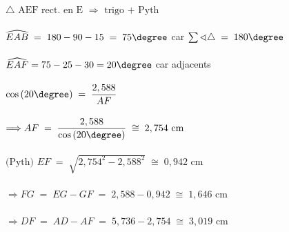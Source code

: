 \begin{itemize}
	$\triangle\mbox{ AEF rect. en E }\Rightarrow\mbox{ trigo + Pyth }$\\
	$ $\\
	$\widehat{EAB}\;=\;180-90-15\;=\;75\degree$ car $\sum \sphericalangle \triangle \;=\; 180\degree$\\
	$ $\\
	$\widehat{EAF}=75-25-30=20\degree$ car adjacents\\
	$ $\\
	$\cos{(20\degree)}\;=\;\dfrac{2,588}{AF}$\\
	$ $\\
	$\Longrightarrow AF\;=\;\dfrac{2,588}{\cos{(20\degree)}}\;\cong\;2,754\mbox{ cm}$\\
	$ $\\
	$\mbox{(Pyth) }  EF\;=\;\sqrt{2,754^2-2,588^2}\;\cong\;0,942\mbox{ cm}$\\
	$ $\\
	$\Longrightarrow FG\;=\;EG-GF\;=\;2,588-0,942\;\cong\;1,646\mbox{ cm}$\\
	$ $\\
	$\Longrightarrow DF\;=\;AD-AF\;=\;5,736-2,754\;\cong\;3,019\mbox{ cm}$
\end{itemize}